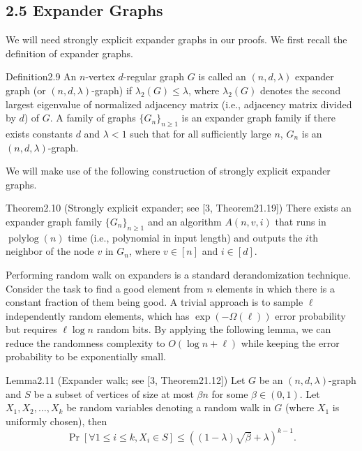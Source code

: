 \subsection*{2.5 Expander Graphs}
We will need strongly explicit expander graphs in our proofs. We first recall the definition of expander graphs.
\begin{authorclaim}{Definition2.9}
An $n$-vertex $d$-regular graph $G$ is called an $(n,d,\lambda)$ expander graph (or $(n,d,\lambda)$-graph) if $\lambda_2(G)\le\lambda$, where $\lambda_2(G)$ denotes the second largest eigenvalue of normalized adjacency matrix (i.e., adjacency matrix divided by $d$) of $G$. A family of graphs $\{G_n\}_{n\ge1}$ is an expander graph family if there exists constants $d$ and $\lambda<1$ such that for all sufficiently large $n$, $G_n$ is an $(n,d,\lambda)$-graph.
\end{authorclaim}
We will make use of the following construction of strongly explicit expander graphs.
\begin{authorclaim}{Theorem2.10 (Strongly explicit expander; see [3, Theorem21.19])}
There exists an expander graph family $\{G_n\}_{n\ge1}$ and an algorithm $A(n,v,i)$ that runs in $\operatorname{polylog}(n)$ time (i.e., polynomial in input length) and outputs the $i$th neighbor of the node $v$ in $G_n$, where $v\in[n]$ and $i\in[d]$.
\end{authorclaim}
Performing random walk on expanders is a standard derandomization technique. Consider the task to find a good element from $n$ elements in which there is a constant fraction of them being good. A trivial approach is to sample $\ell$ independently random elements, which has $\exp(-\Omega(\ell))$ error probability but requires $\ell\log n$ random bits. By applying the following lemma, we can reduce the randomness complexity to $O(\log n+\ell)$ while keeping the error probability to be exponentially small.
\begin{authorclaim}{Lemma2.11 (Expander walk; see [3, Theorem21.12])}
Let $G$ be an $(n,d,\lambda)$-graph and $S$ be a subset of vertices of size at most $\beta n$ for some $\beta\in(0,1)$. Let $X_1,X_2,\ldots,X_k$ be random variables denoting a random walk in $G$ (where $X_1$ is uniformly chosen), then
\[\Pr[\forall1\le i\le k, X_i\in S]\le((1-\lambda)\sqrt\beta+\lambda)^{k-1}.\]
\end{authorclaim}
